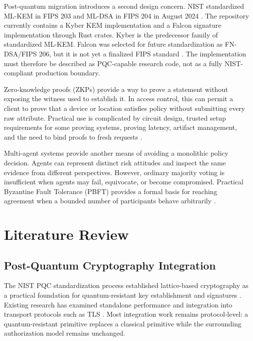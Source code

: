 \documentclass[10pt]{article}
\let\cite\citep
\begin{document}
Post-quantum migration introduces a second design concern. NIST standardized ML-KEM in FIPS 203 and ML-DSA in FIPS 204 in August 2024 \cite{fips204,fips203}. The repository currently contains a Kyber KEM implementation and a Falcon signature implementation through Rust crates. Kyber is the predecessor family of standardized ML-KEM. Falcon was selected for future standardization as FN-DSA/FIPS 206, but it is not yet a finalized FIPS standard \cite{nistpqc}. The implementation must therefore be described as PQC-capable research code, not as a fully NIST-compliant production boundary.

Zero-knowledge proofs (ZKPs) provide a way to prove a statement without exposing the witness used to establish it. In access control, this can permit a client to prove that a device or location satisfies policy without submitting every raw attribute. Practical use is complicated by circuit design, trusted setup requirements for some proving systems, proving latency, artifact management, and the need to bind proofs to fresh requests \cite{zerocash2014,zkpsurvey}.

Multi-agent systems provide another means of avoiding a monolithic policy decision. Agents can represent distinct risk attitudes and inspect the same evidence from different perspectives. However, ordinary majority voting is insufficient when agents may fail, equivocate, or become compromised. Practical Byzantine Fault Tolerance (PBFT) provides a formal basis for reaching agreement when a bounded number of participants behave arbitrarily \cite{pbft,lamport1982}.

\section*{Literature Review}

\subsection*{Post-Quantum Cryptography Integration}

The NIST PQC standardization process established lattice-based cryptography as a practical foundation for quantum-resistant key establishment and signatures \cite{lwerings,nistir8413,fips204,fips203}. Existing research has examined standalone performance and integration into transport protocols such as TLS \cite{pqtls}. Most integration work remains protocol-level: a quantum-resistant primitive replaces a classical primitive while the surrounding authorization model remains unchanged.
\end{document}
